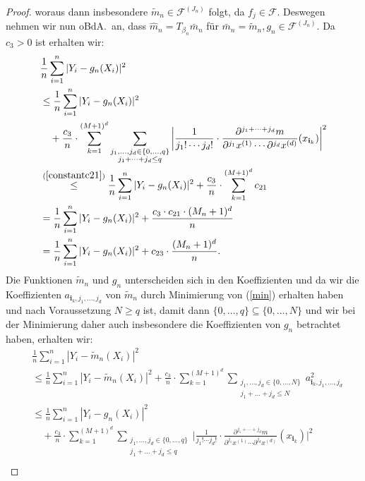 \begin{proof}
woraus dann insbesondere $\tilde{m}_n \in \mathcal{F}^{(J_n)}$ folgt, da $f_j \in \mathcal{F}$.
Deswegen nehmen wir nun oBdA.\ an, dass $\hat{m}_n = T_{\beta_n}\bar{m}_n$ für $\bar{m}_n = \tilde{m}_n, g_n \in \mathcal{F}^{(J_n)}.$
Da $c_3 > 0$ ist erhalten wir$\colon$
\begin{equation}
\begin{split}
\label{g}
& \frac{1}{n} \sum_{i = 1}^n|Y_i - g_n(X_i)|^2 \\
& \leq \frac{1}{n} \sum_{i = 1}^n|Y_i - g_n(X_i)|^2 \\
& \quad + \frac{c_3}{n} \cdot \sum_{k = 1}^{(M + 1)^d} \sum_{\substack{ j_1,\dots,j_d \in \{0,\dots,q\} \\j_1+\dots +j_d \leq q}} \bigg|\frac{1}{j_1! \cdots j_d!} \cdot \frac{\partial^{j_1+\cdots + j_d} m}{\partial^{j_1} x^{(1)}\cdots \partial^{j_d} x^{(d)}}(x_{\mathbf{i}_k})\bigg|^2 \\
& \stackrel{(\ref{constantc21})}{\leq} \frac{1}{n} \sum_{i = 1}^n|Y_i - g_n(X_i)|^2 +  \frac{c_3}{n} \cdot \sum_{k = 1}^{(M + 1)^d} c_{21} \\
& = \frac{1}{n} \sum_{i = 1}^n|Y_i - g_n(X_i)|^2 + \frac{c_3 \cdot c_{21} \cdot (M_n + 1)^d}{n} \\
& = \frac{1}{n} \sum_{i = 1}^n|Y_i - g_n(X_i)|^2 + c_{23} \cdot \frac{(M_n + 1)^d}{n}.
\end{split}
\end{equation}
Die Funktionen $\tilde{m}_n$ und $g_n$ unterscheiden sich in den Koeffizienten und da wir die Koeffizienten $a_{\mathbf{i}_k,j_1,\dots,j_d}$ von $\tilde{m}_n$ durch Minimierung von (\ref{min}) erhalten haben und nach Voraussetzung $N \geq q$ ist, damit dann $\{0,\dots,q\} \subseteq \{0,\dots,N\}$ und wir bei der Minimierung daher auch insbesondere die Koeffizienten von $g_n$ betrachtet haben, erhalten wir$\colon$
\begin{equation}
\begin{split}
\label{tilde}
& \frac{1}{n} \sum_{i = 1}^n|Y_i - \tilde{m}_n(X_i)|^2 \\
& \leq \frac{1}{n} \sum_{i = 1}^n|Y_i - \tilde{m}_n(X_i)|^2 + \frac{c_3}{n} \cdot \sum_{k = 1}^{(M + 1)^d} \sum_{\substack{ j_1,\dots,j_d \in \{0,\dots,N\} \\j_1+\dots +j_d \leq N}} a_{\mathbf{i}_k,j_1,\dots,j_d}^2 \\
& \leq \frac{1}{n} \sum_{i = 1}^n|Y_i - g_n(X_i)|^2 \\
& \quad + \frac{c_3}{n} \cdot \sum_{k = 1}^{(M + 1)^d} \sum_{\substack{ j_1,\dots,j_d \in \{0,\dots,q\} \\j_1+\dots +j_d \leq q}} \bigg|\frac{1}{j_1! \cdots j_d!} \cdot \frac{\partial^{j_1+\cdots + j_d} m}{\partial^{j_1} x^{(1)}\cdots \partial^{j_d} x^{(d)}}(x_{\mathbf{i}_k})\bigg|^2 \\

\end{split}
\end{equation}
\end{proof}
